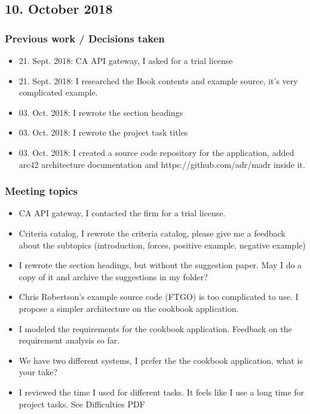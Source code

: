 \documentclass{article}
\begin{document}
        
    
\subsection{10. October 2018}

\subsubsection{Previous work / Decisions taken}
\begin{itemize}
    \item 21. Sept. 2018: CA API gateway, I asked for a trial license
    \item 21. Sept. 2018: I researched the Book contents and example source, it's very complicated example.
    \item 03. Oct. 2018: I rewrote the section headings
    \item 03. Oct. 2018: I rewrote the project task titles
    \item 03. Oct. 2018: I created a source code repository for the application, added arc42 architecture documentation and https://github.com/adr/madr inside it.
\end{itemize}

\subsubsection{Meeting topics}
\begin{itemize}
    \item CA API gateway, I contacted the firm for a trial license.
    \item Criteria catalog, I rewrote the criteria catalog, please give me a feedback about the subtopics (introduction, forces, positive example, negative example)
    \item I rewrote the section headings, but without the suggestion paper. May I do a copy of it and archive the suggestions in my folder?
    \item Chris Robertson's example source code (FTGO) is too complicated to use. I propose a simpler architecture on the cookbook application.
    \item I modeled the requirements for the cookbook application. Feedback on the requirement analysis so far.
    \item We have two different systems, I prefer the the cookbook application, what is your take?
    \item I reviewed the time I used for different tasks. It feels like I use a long time for project tasks. See Difficulties PDF
\end{itemize}
\end{document}

